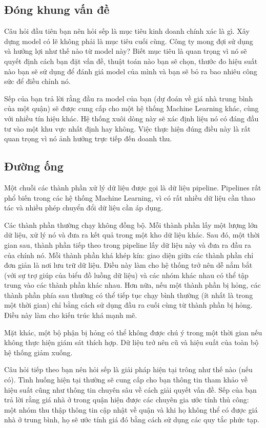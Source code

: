 \subsection{Đóng khung vấn đề}

Câu hỏi đầu tiên bạn nên hỏi sếp là mục tiêu kinh doanh chính xác là gì. Xây dựng model có lẽ không phải là mục tiêu cuối cùng. Công ty mong đợi sử dụng và hưởng lợi như thế nào từ model này? Biết mục tiêu là quan trọng vì nó sẽ quyết định cách bạn đặt vấn đề, thuật toán nào bạn sẽ chọn, thước đo hiệu suất nào bạn sẽ sử dụng để đánh giá model của mình và bạn sẽ bỏ ra bao nhiêu công sức để điều chỉnh nó.

Sếp của bạn trả lời rằng đầu ra model của bạn (dự đoán về giá nhà trung bình của một quận) sẽ được cung cấp cho một hệ thống Machine Learning khác, cùng với nhiều tín hiệu khác. Hệ thống xuôi dòng này sẽ xác định liệu nó có đáng đầu tư vào một khu vực nhất định hay không. Việc thực hiện đúng điều này là rất quan trọng vì nó ảnh hưởng trực tiếp đến doanh thu.

\subsection{Đường ống}

Một chuỗi các thành phần xử lý dữ liệu được gọi là dữ liệu pipeline. Pipelines rất phổ biến trong các hệ thống Machine Learning, vì có rất nhiều dữ liệu cần thao tác và nhiều phép chuyển đổi dữ liệu cần áp dụng.

Các thành phần thường chạy không đồng bộ. Mỗi thành phần lấy một lượng lớn dữ liệu, xử lý nó và đưa ra kết quả trong một kho dữ liệu khác. Sau đó, một thời gian sau, thành phần tiếp theo trong pipeline lấy dữ liệu này và đưa ra đầu ra của chính nó. Mỗi thành phần khá khép kín: giao diện giữa các thành phần chỉ đơn giản là nơi lưu trữ dữ liệu. Điều này làm cho hệ thống trở nên dễ nắm bắt (với sự trợ giúp của biểu đồ luồng dữ liệu) và các nhóm khác nhau có thể tập trung vào các thành phần khác nhau. Hơn nữa, nếu một thành phần bị hỏng, các thành phần phía sau thường có thể tiếp tục chạy bình thường (ít nhất là trong một thời gian) chỉ bằng cách sử dụng đầu ra cuối cùng từ thành phần bị hỏng. Điều này làm cho kiến ​​trúc khá mạnh mẽ.

Mặt khác, một bộ phận bị hỏng có thể không được chú ý trong một thời gian nếu không thực hiện giám sát thích hợp. Dữ liệu trở nên cũ và hiệu suất của toàn bộ hệ thống giảm xuống.

Câu hỏi tiếp theo bạn nên hỏi sếp là giải pháp hiện tại trông như thế nào (nếu có). Tình huống hiện tại thường sẽ cung cấp cho bạn thông tin tham khảo về hiệu suất cũng như thông tin chuyên sâu về cách giải quyết vấn đề. Sếp của bạn trả lời rằng giá nhà ở trong quận hiện được các chuyên gia ước tính thủ công: một nhóm thu thập thông tin cập nhật về quận và khi họ không thể có được giá nhà ở trung bình, họ sẽ ước tính giá đó bằng cách sử dụng các quy tắc phức tạp.

